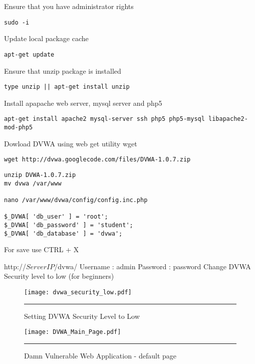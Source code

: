 Ensure that you have administrator rights
\begin{verbatim}
sudo -i
\end{verbatim}

Update local package cache
\begin{verbatim}
apt-get update
\end{verbatim}


Ensure that unzip package is installed
\begin{verbatim}
type unzip || apt-get install unzip
\end{verbatim}

Install apapache web server, mysql server and php5
\begin{verbatim}
apt-get install apache2 mysql-server ssh php5 php5-mysql libapache2-mod-php5
\end{verbatim}


Dowload DVWA using web get utility wget
\begin{verbatim}
wget http://dvwa.googlecode.com/files/DVWA-1.0.7.zip
\end{verbatim}

\begin{verbatim}
unzip DVWA-1.0.7.zip
mv dvwa /var/www

nano /var/www/dvwa/config/config.inc.php

$_DVWA[ 'db_user' ] = 'root';
$_DVWA[ 'db_password' ] = 'student';
$_DVWA[ 'db_database' ] = 'dvwa';
\end{verbatim}
For save use  CTRL + X


http://$ServerIP$/dvwa/
Username : admin
Password : password
Change DVWA Security level to low (for beginners)

\begin{figure}[H] 
 \centering 
 \texttt{[image: dvwa\_security\_low.pdf]}
 \rule{25em}{0.5pt}  
 \caption{Setting DVWA Security Level to Low} 
 \label{Setting DVWA Security Level to Low} 
\end{figure}


\begin{figure}[H] 
 \centering 
 \texttt{[image: DVWA\_Main\_Page.pdf]}
 \rule{30em}{0.5pt}  
 \caption{Damn Vulnerable Web Application - default page} 
 \label{Damn Vulnerable Web Application - default page} 
\end{figure}

